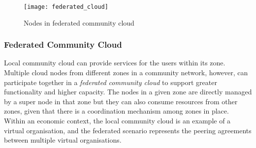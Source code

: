 \begin{figure}[tbp]
   \centering	
		\texttt{[image: federated\_cloud]}
		\caption{Nodes in federated community cloud}
		\label{fig:federated_cloud}	
\end{figure}

\subsubsection{Federated Community Cloud}
\label{sec:fed-cloud}
Local community cloud can provide services for the users within its zone. 
Multiple cloud nodes from different zones in a community network, however, can participate together in a \emph{federated community cloud} to support greater functionality and higher capacity.
The nodes in a given zone are directly managed by a super node in that zone but they can also consume resources from other zones, given that there is a coordination mechanism among zones in place.
Within an economic context, the local community cloud is an example of a virtual organisation, and the federated scenario represents the peering agreements between multiple virtual organisations. 
